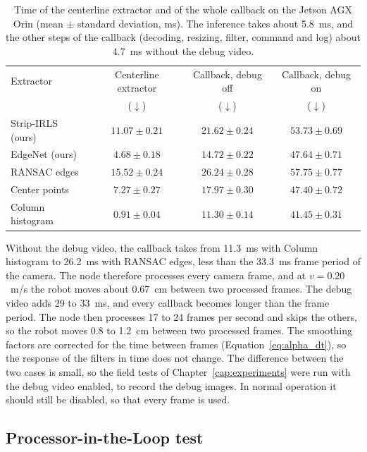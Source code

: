 \begin{table}[H]
    \centering
    \small
    \caption{Time of the centerline extractor and of the whole callback on the Jetson AGX Orin (mean $\pm$ standard deviation, ms). The inference takes about 5.8~ms, and the other steps of the callback (decoding, resizing, filter, command and log) about 4.7~ms without the debug video.}
    \label{tab:jetson_extractors}
    \begin{tabular}{@{}l c c c@{}}
        \toprule
        Extractor & Centerline extractor & Callback, debug off & Callback, debug on \\
         & ($\downarrow$) & ($\downarrow$) & ($\downarrow$) \\
        \midrule
        Strip-IRLS (ours) & $11.07 \pm 0.21$ & $21.62 \pm 0.24$ & $53.73 \pm 0.69$ \\
        EdgeNet (ours) & $4.68 \pm 0.18$ & $14.72 \pm 0.22$ & $47.64 \pm 0.71$ \\
        RANSAC edges & $15.52 \pm 0.24$ & $26.24 \pm 0.28$ & $57.75 \pm 0.77$ \\
        Center points & $7.27 \pm 0.27$ & $17.97 \pm 0.30$ & $47.40 \pm 0.72$ \\
        Column histogram & $0.91 \pm 0.04$ & $11.30 \pm 0.14$ & $41.45 \pm 0.31$ \\
        \bottomrule
    \end{tabular}
\end{table}

Without the debug video, the callback takes from 11.3~ms with Column histogram to 26.2~ms with RANSAC edges, less than the 33.3~ms frame period of the camera. The node therefore processes every camera frame, and at $v=0.20$~m/s the robot moves about 0.67~cm between two processed frames. The debug video adds 29 to 33~ms, and every callback becomes longer than the frame period. The node then processes 17 to 24 frames per second and skips the others, so the robot moves 0.8 to 1.2~cm between two processed frames. The smoothing factors are corrected for the time between frames (Equation~\eqref{eq:alpha_dt}), so the response of the filters in time does not change. The difference between the two cases is small, so the field tests of Chapter~\ref{cap:experiments} were run with the debug video enabled, to record the debug images. In normal operation it should still be disabled, so that every frame is used.

\subsection{Processor-in-the-Loop test}
\label{subsec:sitl}

